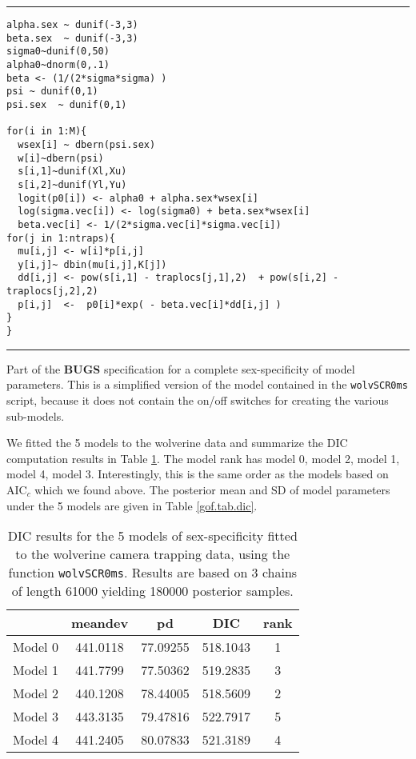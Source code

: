 \begin{panel}[htp]
\centering
\rule[0.15in]{\textwidth}{.03in}
{\small
\begin{verbatim}
alpha.sex ~ dunif(-3,3)
beta.sex  ~ dunif(-3,3)
sigma0~dunif(0,50)
alpha0~dnorm(0,.1)
beta <- (1/(2*sigma*sigma) )
psi ~ dunif(0,1)
psi.sex  ~ dunif(0,1)

for(i in 1:M){
  wsex[i] ~ dbern(psi.sex)
  w[i]~dbern(psi)
  s[i,1]~dunif(Xl,Xu)
  s[i,2]~dunif(Yl,Yu)
  logit(p0[i]) <- alpha0 + alpha.sex*wsex[i]
  log(sigma.vec[i]) <- log(sigma0) + beta.sex*wsex[i]
  beta.vec[i] <- 1/(2*sigma.vec[i]*sigma.vec[i])
for(j in 1:ntraps){
  mu[i,j] <- w[i]*p[i,j]
  y[i,j]~ dbin(mu[i,j],K[j])
  dd[i,j] <- pow(s[i,1] - traplocs[j,1],2)  + pow(s[i,2] - traplocs[j,2],2)
  p[i,j]  <-  p0[i]*exp( - beta.vec[i]*dd[i,j] )
}
}
\end{verbatim}
}
\rule[-0.15in]{\textwidth}{.03in}
\caption{
Part of the {\bf BUGS} specification for a complete sex-specificity of model
parameters. This is a simplified version of the model contained in the 
\mbox{\tt wolvSCR0ms} script, because it does not contain the on/off
switches for creating the various sub-models. 
}
\label{gof.panel.sexmodel}
\end{panel}


We fitted the 5 models to the wolverine data and summarize
the DIC computation results in Table \ref{gof.tab.DIC}. 
The model rank has model 0, model 2, model 1, model 4, model 3.
Interestingly, this is the same order as the models based on AIC$_c$
which we found above. 
The posterior mean and SD of model parameters under the 5 models are
given in Table \ref{gof.tab.dic}. 

\begin{table}
\centering
\caption{
DIC results for the 5 models of sex-specificity fitted to the
wolverine camera trapping data, using the function
\mbox{\tt wolvSCR0ms}. Results are based on 3 chains of length 61000
yielding 180000 posterior samples. 
}
\begin{tabular}{ccccc} \hline \hline
      &  meandev  &  pd   &    DIC  &   rank \\ \hline
Model 0&  441.0118& 77.09255&518.1043&    1 \\
Model 1& 441.7799 &77.50362 &519.2835&    3\\
Model 2& 440.1208 &78.44005 &518.5609&    2\\
Model 3& 443.3135 &79.47816 &522.7917&    5\\
Model 4& 441.2405 &80.07833 &521.3189&    4\\
\end{tabular}
\label{gof.tab.DIC}
\end{table}



